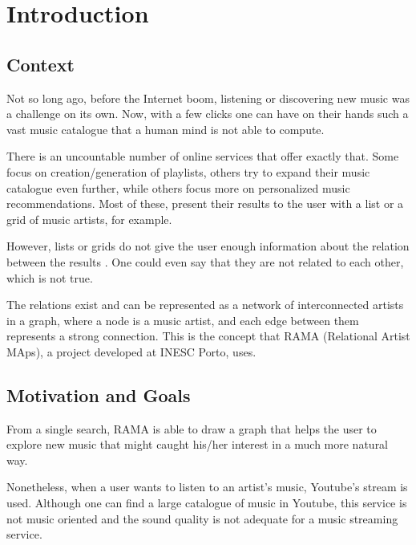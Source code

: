 
\chapter{Introduction} \label{chap:intro}


\section*{}

\section{Context} \label{sec:context}


Not so long ago, before the Internet boom, listening or discovering new music was a challenge on its own.
Now, with a few clicks one can have on their hands such a vast music catalogue that a human mind is not able to compute.

There is an uncountable number of online services that offer exactly that.
Some focus on creation/generation of playlists, others try to expand their music catalogue even further, while others focus more on personalized music recommendations.
Most of these, present their results to the user with a list or a grid of music artists, for example.

However, lists or grids do not give the user enough information about the relation between the results \cite{Lamere2008}.
One could even say that they are not related to each other, which is not true.

The relations exist and can be represented as a network of interconnected artists in a graph, where a node is a music artist, and each edge between them represents a strong connection.
This is the concept that RAMA (Relational Artist MAps), a project developed at INESC Porto, uses. \cite{Costa2008} \cite{Sarmento2009} \cite{Costa2009} \cite{Gouyon2011}

\section{Motivation and Goals} \label{sec:goals}


From a single search, RAMA is able to draw a graph that helps the user to explore new music that might caught his/her interest in a much more natural way.

Nonetheless, when a user wants to listen to an artist's music, Youtube's stream is used.
Although one can find a large catalogue of music in Youtube, this service is not music oriented and the sound quality is not adequate for a music streaming service.

